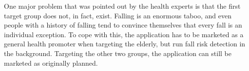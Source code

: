 One major problem that was pointed out by the health experts is that the first target group does not, in fact, exist. Falling is an enormous taboo, and even people with a history of falling tend to convince themselves that every fall is an individual exception. To cope with this, the application has to be marketed as a general health promoter when targeting the elderly, but run fall risk detection in the background. Targeting the other two groups, the application can still be marketed as originally planned. 